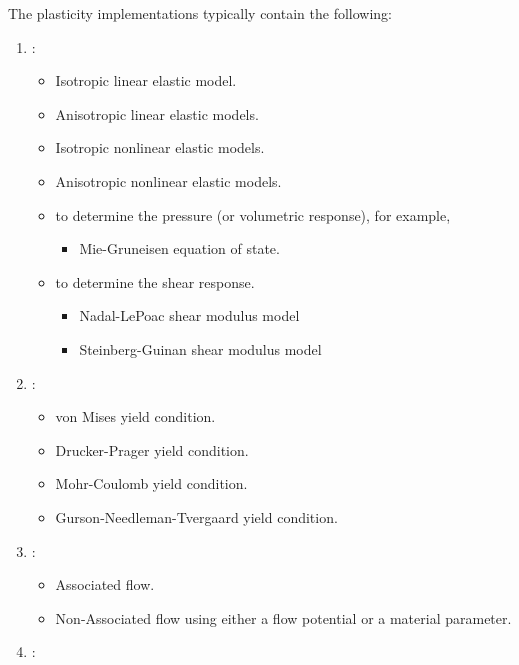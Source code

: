 The plasticity implementations typically contain the following:
\begin{enumerate}
    \item {}:
      \begin{itemize}
        \item Isotropic linear elastic model. 
        \item Anisotropic linear elastic models.
        \item Isotropic nonlinear elastic models.
        \item Anisotropic nonlinear elastic models.
        \item {} to determine the pressure (or 
              volumetric response), for example, 
          \begin{itemize}
            \item Mie-Gruneisen equation of state.
          \end{itemize}
        \item {} to determine the shear
              response.
          \begin{itemize}
            \item Nadal-LePoac shear modulus model
            \item Steinberg-Guinan shear modulus model
          \end{itemize}
      \end{itemize}
    \item {}:
      \begin{itemize} 
        \item von Mises yield condition.
        \item Drucker-Prager yield condition.
        \item Mohr-Coulomb yield condition.
        \item Gurson-Needleman-Tvergaard yield condition.
      \end{itemize} 
    \item {}:
      \begin{itemize}
        \item Associated flow.
        \item Non-Associated flow using either a flow potential or
              a material parameter.
      \end{itemize}
    \item {}:
      \begin{itemize}

\end{itemize}
\end{enumerate}
